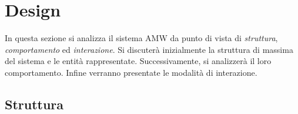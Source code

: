 \section{Design}




In questa sezione si analizza il sistema AMW da punto di vista di \textit{struttura}, \textit{comportamento} ed \textit{interazione}.
Si discuterà inizialmente la struttura di massima del sistema e le entità rappresentate. Successivamente, si analizzerà il loro comportamento. Infine verranno presentate le modalità di interazione.

\subsection{Struttura}


